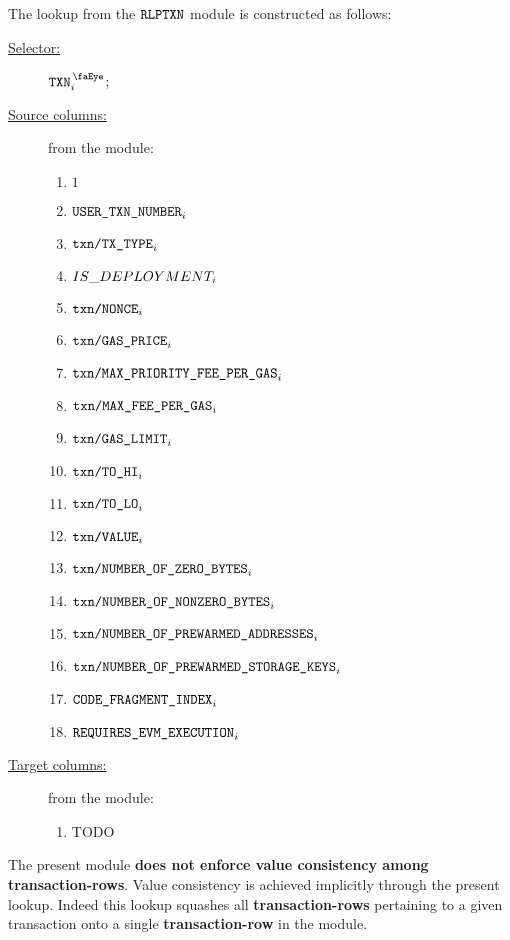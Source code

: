 The lookup from the $\texttt{RLPTXN}$ module is constructed as follows:
\begin{description}
	\item[\underline{Selector:}] $\isTxn _{i}$;
	\item[\underline{Source columns:}] from the \rlpTxnMod{} module:
		\begin{multicols}{3}
			\begin{enumerate}
				\item $1$
				\item $\texttt{USER}\texttt{\_}\texttt{TXN\_NUMBER}                       _{i}$
				\item $\texttt{txn}\texttt{/}\texttt{{TX\_TYPE}}               _{i}$
				\item $IS\_DEPLOYMENT                     _{i}$
				\item $\texttt{txn}\texttt{/}\texttt{{\texttt{NONCE}}}                _{i}$
				\item $\texttt{txn}\texttt{/}\texttt{{GAS\_PRICE}}             _{i}$
				\item $\texttt{txn}\texttt{/}\texttt{{MAX\_PRIORITY\_FEE\_PER\_GAS}} _{i}$
				\item $\texttt{txn}\texttt{/}\texttt{{MAX\_FEE\_PER\_GAS}}         _{i}$
				\item $\texttt{txn}\texttt{/}\texttt{{GAS\_LIMIT}}             _{i}$
				\item $\texttt{txn}\texttt{/}\texttt{{TO\_HI}}                 _{i}$
				\item $\texttt{txn}\texttt{/}\texttt{{TO\_LO}}                 _{i}$
				\item $\texttt{txn}\texttt{/}\texttt{{VALUE}}             _{i}$
				\item $\texttt{txn}\texttt{/}\texttt{{NUMBER\_OF\_ZERO\_BYTES}}         _{i}$
				\item $\texttt{txn}\texttt{/}\texttt{{NUMBER\_OF\_NONZERO\_BYTES}}      _{i}$
				\item $\texttt{txn}\texttt{/}\texttt{{NUMBER\_OF\_PREWARMED\_ADDRESSES}}      _{i}$
				\item $\texttt{txn}\texttt{/}\texttt{{NUMBER\_OF\_PREWARMED\_STORAGE\_KEYS}}   _{i}$
				\item $\texttt{CODE\_FRAGMENT\_INDEX}                                         _{i}$
				\item $\texttt{REQUIRES\_EVM\_EXECUTION}      _{i}$
			\end{enumerate}
		\end{multicols}
	\item[\underline{Target columns:}] from the \userTxnDataMod{} module: 
		\begin{multicols}{3}
			\begin{enumerate}
				\item TODO
			\end{enumerate} 
		\end{multicols}
\end{description}
\saNote{}
The present module \textbf{does not enforce value consistency among transaction-rows}.
Value consistency is achieved implicitly through the present lookup.
Indeed this lookup squashes all \textbf{transaction-rows} pertaining to a given transaction
onto a single \textbf{transaction-row} in the \rlpTxnMod{} module.
